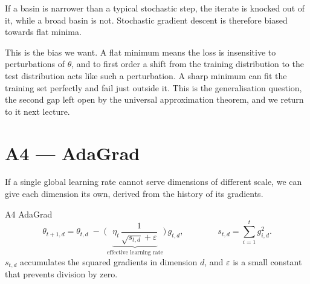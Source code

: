 \documentclass[11pt]{article}
\begin{document}
\begin{center}
\end{center}

\noindent
If a basin is narrower than a typical stochastic step, the iterate is knocked out of it,
while a broad basin is not. Stochastic gradient descent is therefore biased towards flat
minima.

\medskip
\noindent
This is the bias we want. A flat minimum means the loss is insensitive to perturbations of
$\theta$, and to first order a shift from the training distribution to the test
distribution acts like such a perturbation. A sharp minimum can fit the training set
perfectly and fail just outside it. This is the generalisation question, the second gap
left open by the universal approximation theorem, and we return to it next lecture.

\section{A4 --- AdaGrad}

If a single global learning rate cannot serve dimensions of different scale, we can give
each dimension its own, derived from the history of its gradients.

\begin{algbox}{A4 \; AdaGrad}
\[
  \theta_{t+1,d} = \theta_{t,d}
  \;-\;
  \Bigg(
    \underbrace{\eta_{t}\,\frac{1}{\sqrt{s_{t,d}} + \varepsilon}}_{\text{effective learning rate}}
  \Bigg)\, g_{t,d},
  \qquad\qquad
  s_{t,d} = \sum_{i=1}^{t} g_{i,d}^{2}.
\]
$s_{t,d}$ accumulates the squared gradients in dimension $d$, and $\varepsilon$ is a
small constant that prevents division by zero.
\end{algbox}
\end{document}
